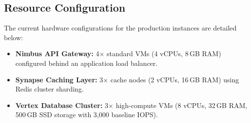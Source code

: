 \subsection{Resource Configuration}
The current hardware configurations for the production instances are detailed below:
\begin{itemize}[noitemsep]
  \item \textbf{Nimbus API Gateway:} 4$\times$ standard VMs (4 vCPUs, 8\,GB RAM) configured behind an application load balancer.
  \item \textbf{Synapse Caching Layer:} 3$\times$ cache nodes (2 vCPUs, 16\,GB RAM) using Redis cluster sharding.
  \item \textbf{Vertex Database Cluster:} 3$\times$ high-compute VMs (8 vCPUs, 32\,GB RAM, 500\,GB SSD storage with 3,000 baseline IOPS).
\end{itemize}
